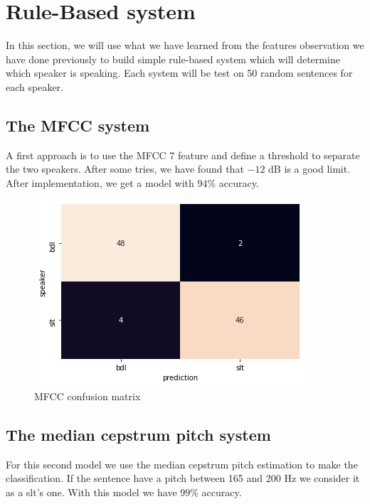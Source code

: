 \documentclass[]{article}
\begin{document}
\section{Rule-Based system}

In this section, we will use what we have learned from the features observation we have 
done previously to build simple rule-based system which will determine which speaker is
speaking. Each system will be test on 50 random sentences for each speaker.

\subsection{The MFCC system}

A first approach is to use the MFCC 7 feature and define a threshold to separate the two speakers.
After some tries, we have found that $-12$ dB is a good limit. After implementation, we get a model
with $94\%$ accuracy.


\begin{figure}[H]
    \centering
    \caption{\label{confusion1}MFCC confusion matrix}
    \includegraphics[scale=0.5]{images/confusion1.png}
\end{figure}

\subsection{The median cepstrum pitch system}

For this second model we use the median cepstrum pitch estimation to make the classification.
If the sentence have a pitch between 165 and 200 Hz we consider it as a  slt's one.
With this model we have $99\%$ accuracy.
\end{document}
